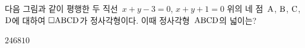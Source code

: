 \noindent\begin{minipage}[t]{0.58\linewidth}\vspace{0pt}다음 그림과 같이 평행한 두 직선~$x+y-3=0$, $x+y+1=0$ 위의 네 점~$\mathrm{A}$, $\mathrm{B}$, $\mathrm{C}$, $\mathrm{D}$에 대하여 $\square\mathrm{ABCD}$가 정사각형이다. 이때 정사각형~$\mathrm{ABCD}$의 넓이는?\end{minipage}\hfill\begin{minipage}[t]{0.4\linewidth}\vspace{0pt}\centering \end{minipage}\par
\begin{choices32}{$2$}{$4$}{$6$}{$8$}{$10$}\end{choices32}
